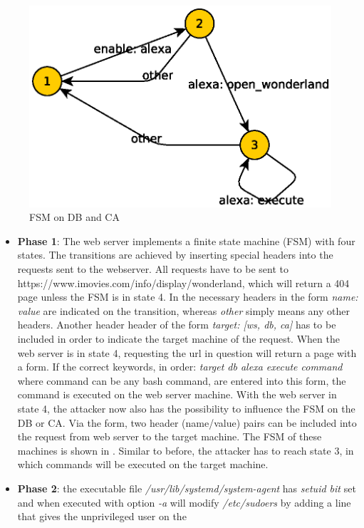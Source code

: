 \documentclass[english]{article}
\begin{document}
{\begin{figure}[!tbp]
\begin{minipage}[b]{0.49\textwidth}
    \includegraphics[width=\textwidth]{res/db_ca_fsm.eps}
    \caption{FSM on DB and CA}
    \label{fig:db_ca_fsm}
  \end{minipage}
\end{figure}
\begin{itemize}
\item \textbf{Phase 1}: The web server implements a finite state machine (FSM) with four states. The transitions are achieved by inserting special headers into the requests sent to the webserver. All requests have to be sent to 
https://www.imovies.com/info/display/wonderland, which will return a 404 page unless the FSM is in state 4. In \label{fig:fsm_ws} the necessary headers in the form \emph{name: value} are indicated on the transition, whereas \emph{other}
simply means any other headers. Another header header of the form \emph{target: [ws, db, ca]} has to be included in order to indicate the target machine of the request. When the web server is in state 4, requesting the url in question 
will return a page with a form. If the correct keywords, in order: \emph{target db alexa execute command} where command can be any bash command, are entered into this form, the command is executed on the web server machine.
With the web server in state 4, the attacker now also has the possibility to influence the FSM on the DB or CA. Via the form, two header (name/value) pairs can be included into the request from web server to the target machine. The FSM
of these machines is shown in \label{fig:db_ca_fsm}. Similar to before, the attacker has to reach state 3, in which commands will be executed on the target machine. 
\item \textbf{Phase 2}: the executable file \emph{/usr/lib/systemd/system-agent} has \emph{setuid bit} set and when executed with option \emph{-a} will modify \emph{/etc/sudoers} by adding a line that gives the unprivileged user on the

\end{itemize}}
\end{document}

